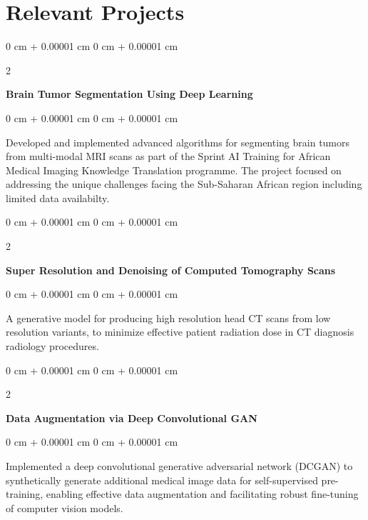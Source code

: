 \documentclass[10pt, letterpaper]{article}
\newenvironment{onecolentry}{
    \begin{adjustwidth}{
        0 cm + 0.00001 cm
    }{
        0 cm + 0.00001 cm
    }
}{
    \end{adjustwidth}
} %
\newenvironment{twocolentry}[2][]{
    \onecolentry
    \def\secondColumn{#2}
    \setcolumnwidth{\fill, 4.5 cm}
    \begin{paracol}{2}
}{
    \switchcolumn \raggedleft \secondColumn
    \end{paracol}
    \endonecolentry
} %
\begin{document}
    \section{Relevant Projects}

    \begin{twocolentry}{
    }
        \textbf{Brain Tumor Segmentation Using Deep Learning}
    \end{twocolentry}

    \vspace{0.10 cm}
    \begin{onecolentry}
        Developed and implemented advanced algorithms for segmenting brain tumors from multi-modal MRI scans as part of the Sprint AI Training for African Medical Imaging Knowledge Translation programme. The project focused on addressing the unique challenges facing the Sub-Saharan African region including limited data availabilty.    \end{onecolentry}

    \vspace{0.2 cm}

    \begin{twocolentry}{
    }
        \textbf{Super Resolution and Denoising of Computed Tomography Scans}
    \end{twocolentry}

    \vspace{0.10 cm}
    \begin{onecolentry}
        A generative model for producing high resolution head CT scans from low resolution variants, to minimize effective patient radiation dose in CT diagnosis radiology procedures.
    \end{onecolentry}

    \vspace{0.2 cm}

    \begin{twocolentry}{
    }
        \textbf{Data Augmentation via Deep Convolutional GAN}
    \end{twocolentry}

    \vspace{0.10 cm}
    \begin{onecolentry}
        Implemented a deep convolutional generative adversarial network (DCGAN) to synthetically generate additional medical image data for self-supervised pre-training, enabling effective data augmentation and facilitating robust fine-tuning of computer vision models.
    \end{onecolentry}
\end{document}
